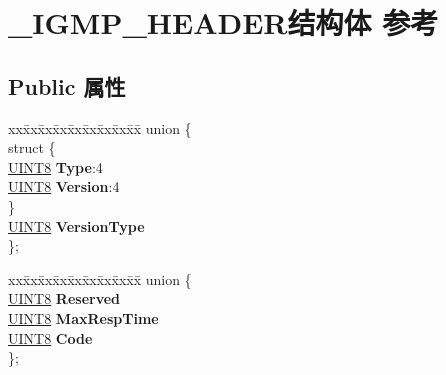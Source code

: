 \hypertarget{struct___i_g_m_p___h_e_a_d_e_r}{}\section{\+\_\+\+I\+G\+M\+P\+\_\+\+H\+E\+A\+D\+E\+R结构体 参考}
\label{struct___i_g_m_p___h_e_a_d_e_r}
\subsection*{Public 属性}
\begin{DoxyCompactItemize}
\item 
\mbox{\label{struct___i_g_m_p___h_e_a_d_e_r_a94860ece4fef2bb068fd86eb1a34e8df}} 
\begin{tabbing}
xx\=xx\=xx\=xx\=xx\=xx\=xx\=xx\=xx\=\kill
union \{\\
\mbox{\label{union___i_g_m_p___h_e_a_d_e_r_1_1_0D2647_a25b359c20d80ea52a1241f4aa6cfebea}} 
\>struct \{\\
\>\>\hyperlink{_processor_bind_8h_ab27e9918b538ce9d8ca692479b375b6a}{UINT8} {\bfseries Type}:4\\
\>\>\hyperlink{_processor_bind_8h_ab27e9918b538ce9d8ca692479b375b6a}{UINT8} {\bfseries Version}:4\\
\>\} \\
\>\hyperlink{_processor_bind_8h_ab27e9918b538ce9d8ca692479b375b6a}{UINT8} {\bfseries VersionType}\\
\}; \\

\end{tabbing}\item 
\mbox{\label{struct___i_g_m_p___h_e_a_d_e_r_aed771a2f4aeeed825d3fed39d9fb68ed}} 
\begin{tabbing}
xx\=xx\=xx\=xx\=xx\=xx\=xx\=xx\=xx\=\kill
union \{\\
\>\hyperlink{_processor_bind_8h_ab27e9918b538ce9d8ca692479b375b6a}{UINT8} {\bfseries Reserved}\\
\>\hyperlink{_processor_bind_8h_ab27e9918b538ce9d8ca692479b375b6a}{UINT8} {\bfseries MaxRespTime}\\
\>\hyperlink{_processor_bind_8h_ab27e9918b538ce9d8ca692479b375b6a}{UINT8} {\bfseries Code}\\
\}; \\


\end{tabbing}
\end{DoxyCompactItemize}
